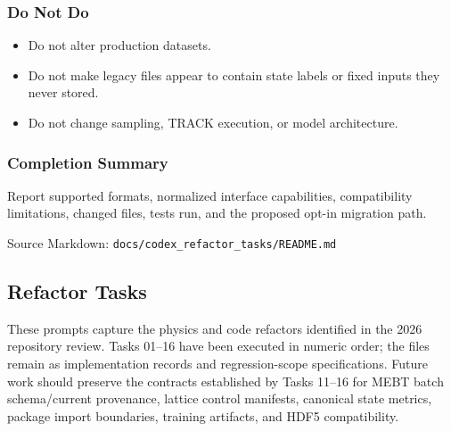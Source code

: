 \documentclass[
]{article}
\providecommand{\tightlist}{%
  \setlength{\itemsep}{0pt}\setlength{\parskip}{0pt}}
\begin{document}
\hypertarget{do-not-do-5}{%
\subsubsection{Do Not Do}\label{do-not-do-5}}

\begin{itemize}
\tightlist
\item
  Do not alter production datasets.
\item
  Do not make legacy files appear to contain state labels or fixed
  inputs they never stored.
\item
  Do not change sampling, TRACK execution, or model architecture.
\end{itemize}

\hypertarget{completion-summary-5}{%
\subsubsection{Completion Summary}\label{completion-summary-5}}

Report supported formats, normalized interface capabilities,
compatibility limitations, changed files, tests run, and the proposed
opt-in migration path.

Source Markdown: \texttt{docs/codex\_refactor\_tasks/README.md}

\hypertarget{refactor-tasks}{%
\subsection{Refactor Tasks}\label{refactor-tasks}}

These prompts capture the physics and code refactors identified in the
2026 repository review. Tasks 01--16 have been executed in numeric
order; the files remain as implementation records and regression-scope
specifications. Future work should preserve the contracts established by
Tasks 11--16 for MEBT batch schema/current provenance, lattice control
manifests, canonical state metrics, package import boundaries, training
artifacts, and HDF5 compatibility.
\end{document}
